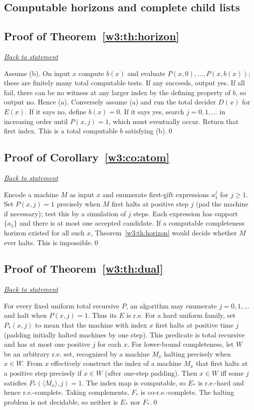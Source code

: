 \documentclass[11pt,letterpaper]{article}
\theoremstyle{definition}\newtheorem{definition}[theorem]{Definition}\newtheorem{example}[theorem]{Example}
\theoremstyle{remark}\newtheorem{remark}[theorem]{Remark}
\newcommand{\backlink}[1]{\noindent\hyperref[#1]{\textit{Back to statement}}\par\smallskip}
\begin{document}
\subsection*{Computable horizons and complete child lists}

\subsection{Proof of Theorem~\ref{w3:th:horizon}}\label{w3:pr:horizon}\backlink{w3:th:horizon}
Assume (b). On input $x$ compute $b(x)$ and evaluate $P(x,0),\dots,P(x,b(x))$; these are finitely many total computable tests. If any succeeds, output yes. If all fail, there can be no witness at any larger index by the defining property of $b$, so output no. Hence (a). Conversely assume (a) and run the total decider $D(x)$ for $E(x)$. If it says no, define $b(x)=0$. If it says yes, search $j=0,1,\dots$ in increasing order until $P(x,j)=1$, which must eventually occur. Return that first index. This is a total computable $b$ satisfying (b).\qed

\subsection{Proof of Corollary~\ref{w3:co:atom}}\label{w3:pr:atom}\backlink{w3:co:atom}
Encode a machine $M$ as input $x$ and enumerate first-gift expressions $a_1^j$ for $j\ge1$. Set $P(x,j)=1$ precisely when $M$ first halts at positive step $j$ (pad the machine if necessary); test this by a simulation of $j$ steps. Each expression has support $\{a_1\}$ and there is at most one accepted candidate. If a computable completeness horizon existed for all such $x$, Theorem~\ref{w3:th:horizon} would decide whether $M$ ever halts. This is impossible.\qed

\subsection{Proof of Theorem~\ref{w3:th:dual}}\label{w3:pr:dual}\backlink{w3:th:dual}
For every fixed uniform total recursive $P$, an algorithm may enumerate $j=0,1,\dots$ and halt when $P(x,j)=1$. Thus its $E$ is r.e. For a hard uniform family, set $P_*(x,j)$ to mean that the machine with index $x$ first halts at positive time $j$ (padding initially halted machines by one step). This predicate is total recursive and has at most one positive $j$ for each $x$. For lower-bound completeness, let $W$ be an arbitrary r.e. set, recognized by a machine $M_x$ halting precisely when $x\in W$. From $x$ effectively construct the index of a machine $M_x$ that first halts at a positive step precisely if $x\in W$ (after one-step padding). Then $x\in W$ iff some $j$ satisfies $P_*(\langle M_x\rangle,j)=1$. The index map is computable, so $E_*$ is r.e.-hard and hence r.e.-complete. Taking complements, $F_*$ is co-r.e.-complete. The halting problem is not decidable, so neither is $E_*$ nor $F_*$.\qed
\end{document}
